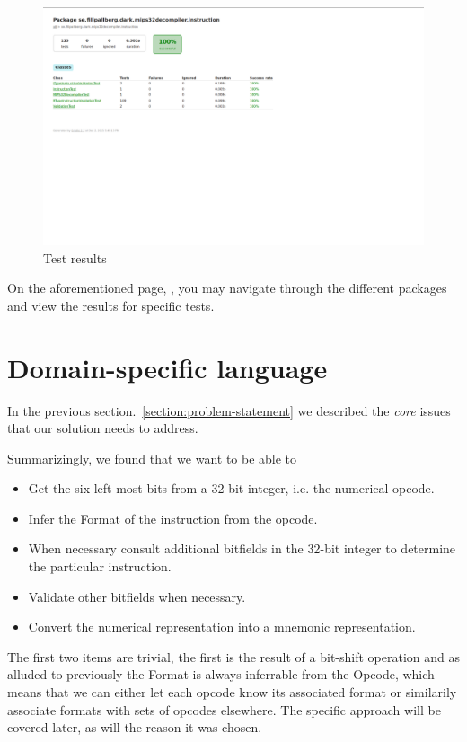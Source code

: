 \documentclass[a4paper]{article}
\begin{document}
\FloatBarrier
\begin{figure}[H]
\centering
\includegraphics[scale=0.2]{img/tests.png}
\caption{Test results}
\label{fig:tests}
\end{figure}
\FloatBarrier

On the aforementioned page, , you may navigate through
the different packages and view the results for specific tests.

\section{Domain-specific language}

In the previous section.~\ref{section:problem-statement} we described
the \emph{core} issues that our solution needs to address. 

Summarizingly, we found that we want to be able to

\begin{itemize}
\item Get the six left-most bits from a 32-bit integer,
  i.e. the numerical opcode.
\item Infer the Format of the instruction from the opcode.
\item When necessary consult additional bitfields in the 32-bit integer to
      determine the particular instruction.
\item Validate other bitfields when necessary.
\item Convert the numerical representation into a mnemonic representation.
\end{itemize}

The first two items are trivial, the first is the result of a
bit-shift operation and as alluded to previously the Format is always
inferrable from the Opcode, which means that we can either let each
opcode know its associated format or similarily associate formats
with sets of opcodes elsewhere. The specific approach will be covered
later, as will the reason it was chosen.
\end{document}
